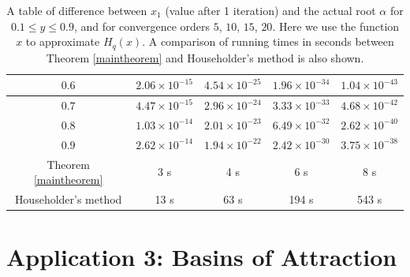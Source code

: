 \documentclass{article}
\begin{document}
\begin{table}[t]
\begin{tabular}{|c|cccc|}
$0.6$                & \multicolumn{1}{c|}{$2.06\times 10^{-15}$}                                    & \multicolumn{1}{c|}{$4.54\times 10^{-25}$} & \multicolumn{1}{c|}{$1.96\times 10^{-34}$} & $1.04\times 10^{-43}$ \\ \hline
$0.7$                & \multicolumn{1}{c|}{$4.47\times 10^{-15}$}                                    & \multicolumn{1}{c|}{$2.96\times 10^{-24}$} & \multicolumn{1}{c|}{$3.33\times 10^{-33}$} & $4.68\times 10^{-42}$ \\ \hline
$0.8$                & \multicolumn{1}{c|}{$1.03\times 10^{-14}$} & \multicolumn{1}{c|}{$2.01\times 10^{-23}$} & \multicolumn{1}{c|}{$6.49\times 10^{-32}$} & $2.62\times 10^{-40}$ \\ \hline
$0.9$                & \multicolumn{1}{c|}{$2.62\times 10^{-14}$}                                    & \multicolumn{1}{c|}{$1.94\times 10^{-22}$} & \multicolumn{1}{c|}{$2.42\times 10^{-30}$} & $3.75\times 10^{-38}$ \\ \hline
Theorem  \ref{maintheorem}            & \multicolumn{1}{c|}{3 s}                                                    & \multicolumn{1}{c|}{4 s}                 & \multicolumn{1}{c|}{6 s}                 & 8 s                 \\ \hline
Householder's method & \multicolumn{1}{c|}{13 s}                                                   & \multicolumn{1}{c|}{63 s}           & \multicolumn{1}{c|}{194 s}          & 543 s           \\ \hline
\end{tabular}
\medskip
\caption{A table of difference between $x_{1}$ (value after 1 iteration) and the actual root $\alpha$ for $0.1\leq y\leq 0.9$, and for convergence orders $5$, $10$, $15$, $20$. Here we use the function $x$ to approximate $H_{q}(x)$. A comparison of running times in seconds between Theorem \ref{maintheorem} and Householder's method is also shown.}\label{Hq-x}
\end{table}



\section{Application 3: Basins of Attraction}
\end{document}
